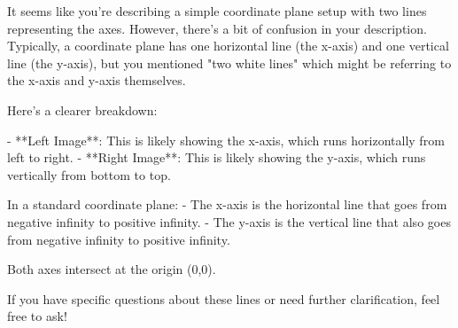 It seems like you're describing a simple coordinate plane setup with two lines representing the axes. However, there's a bit of confusion in your description. Typically, a coordinate plane has one horizontal line (the x-axis) and one vertical line (the y-axis), but you mentioned "two white lines" which might be referring to the x-axis and y-axis themselves.

Here’s a clearer breakdown:

- **Left Image**: This is likely showing the x-axis, which runs horizontally from left to right.
- **Right Image**: This is likely showing the y-axis, which runs vertically from bottom to top.

In a standard coordinate plane:
- The x-axis is the horizontal line that goes from negative infinity to positive infinity.
- The y-axis is the vertical line that also goes from negative infinity to positive infinity.

Both axes intersect at the origin (0,0).

If you have specific questions about these lines or need further clarification, feel free to ask!